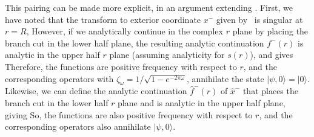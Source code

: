 This pairing can be made more explicit, in an argument extending  .  First, we have noted that the transform to exterior coordinate $x^-$ given by \XtorT\ is singular at $r=R$,
%
\eqn{}
%
However, if we analytically continue in the complex $r$ plane by placing the branch cut in the lower half plane, the resulting analytic continuation $f^-(r)$ is analytic in the upper half $r$ plane (assuming analyticity for $s(r)$), and gives
%
\eqn{}
%
Therefore, the functions 
%
\eqn{}
%
are positive frequency with respect to $r$, and the corresponding operators
%
\eqn{}
%
with $\zeta_\omega = 1/\sqrt{1-e^{-2\pi\omega}}$, 
annihilate the state $|\psi,0\rangle=|0\rangle$.  Likewise, we can define the analytic continuation $\hat f^-(r)$ of $\hat x^-$
that places the branch cut in the lower half $r$ plane and is analytic in the upper half plane, giving
%
\eqn{}
%
So, the functions
%
\eqn{}
% 
are also positive frequency with respect to $r$, and the corresponding operators
%
\eqn{}
%
also annihilate $|\psi,0\rangle$.  

